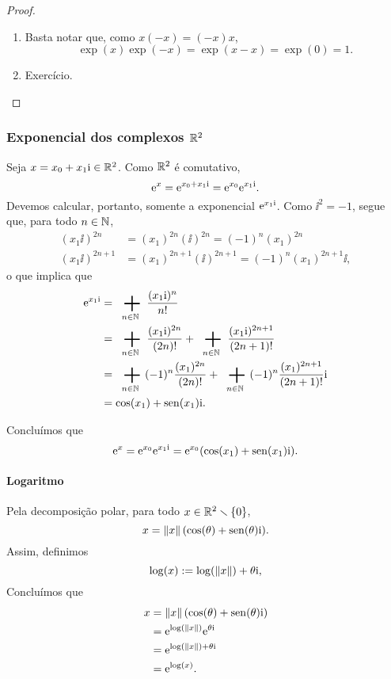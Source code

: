 \begin{proof}
\begin{enumerate}
	\item Basta notar que, como $x(-x)=(-x)x$,
		\begin{equation*}
		\exp(x)\exp(-x) = \exp(x-x) = \exp(0) = 1.
		\end{equation*}

	\item Exercício. \qedhere
	\end{enumerate}
\end{proof}


\subsubsection{Exponencial dos complexos $\mathbb{R}^2$}

Seja $x = x_0 + x_1 \mathrm{i} \in \mathbb{R}^2$. Como $\mathbb{R}^2$ é comutativo,
	\begin{equation*}
	\mathrm{e}^{x} = \mathrm{e}^{x_0 + x_1 \mathrm{i}} = \mathrm{e}^{x_0}\mathrm{e}^{x_1 \mathrm{i}}.
	\end{equation*}
Devemos calcular, portanto, somente a exponencial $\mathrm{e}^{x_1 \mathrm{i}}$. Como $\ii^2 = -1$, segue que, para todo $n \in \mathbb{N}$,
	\begin{align*}
	(x_1 \ii)^{2n} &= (x_1)^{2n}(\ii)^{2n} = (-1)^n (x_1)^{2n} \\
	(x_1 \ii)^{2n+1} &= (x_1)^{2n+1}(\ii)^{2n+1} = (-1)^n (x_1)^{2n+1}\ii,
	\end{align*}
o que implica que
	\begin{align*}
	\e^{x_1 \ii} &= \sum_{n \in \N} \frac{(x_1 \ii)^n}{n!} \\
		&= \sum_{n \in \N} \frac{(x_1 \ii)^{2n}}{(2n)!} + \sum_{n \in \N} \frac{(x_1 \ii)^{2n+1}}{(2n+1)!} \\
		&= \sum_{n \in \N} (-1)^n \frac{(x_1)^{2n}}{(2n)!} + \sum_{n \in \N} (-1)^n \frac{(x_1)^{2n+1}}{(2n+1)!}\ii \\
		&= \cos(x_1) + \sin(x_1)\ii.
	\end{align*}

Concluímos que
	\begin{equation*}
	\mathrm{e}^{x} = \mathrm{e}^{x_0}\mathrm{e}^{x_1 \mathrm{i}} = \mathrm{e}^{x_0}(\cos(x_1) + \operatorname{sen}(x_1)\mathrm{i}).
	\end{equation*}

\paragraph{Logaritmo} Pela decomposição polar, para todo $x \in \mathbb{R}^2 \smallsetminus \{0\}$,
	\begin{equation*}
	x = \left\Vert{x}\right\Vert(\cos(\theta)+\operatorname{sen}(\theta)\mathrm{i}).
	\end{equation*}
Assim, definimos
	\begin{equation*}
	\log(x) := \log(\left\Vert{x}\right\Vert) + \theta \mathrm{i},
	\end{equation*}
Concluímos que
	\begin{align*}
	x &= \left\Vert{x}\right\Vert(\cos(\theta)+\operatorname{sen}(\theta) \mathrm{i}) \\
		&= \mathrm{e}^{\log(\left\Vert{x}\right\Vert)}\mathrm{e}^{\theta \mathrm{i}} \\
		&= \mathrm{e}^{\log(\left\Vert{x}\right\Vert) + \theta \mathrm{i}} \\
		&= \mathrm{e}^{\log(x)}.
	\end{align*}

